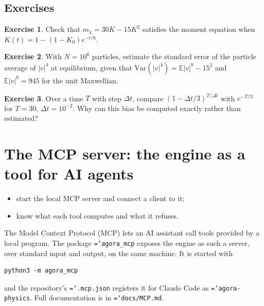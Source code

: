 \documentclass[11pt,a4paper,openany]{book}
\newcommand{\code}[1]{\texttt{\hyphenchar\font=`\-\relax #1}}
\theoremstyle{definition}
\newtheorem{exercise}{Exercise}[chapter]
\theoremstyle{plain}
\begin{document}
\section*{Exercises}
\begin{exercise}\label{ex:m4}
Check that $m_4=30K-15K^2$ satisfies the moment equation when $K(t)=1-(1-K_0)e^{-t/6}$.
\end{exercise}
\begin{exercise}\label{ex:mcerr}
With $N=10^6$ particles, estimate the standard error of the particle average of $|v|^4$ at
equilibrium, given that $\mathrm{Var}(|v|^4)=\mathbb E|v|^8-15^2$ and $\mathbb E|v|^8=945$ for the
unit Maxwellian.
\end{exercise}
\begin{exercise}\label{ex:bias}
Over a time $T$ with step $\Delta t$, compare $(1-\Delta t/3)^{T/\Delta t}$ with $e^{-T/3}$ for
$T=30$, $\Delta t=10^{-2}$. Why can this bias be computed exactly rather than estimated?
\end{exercise}

\chapter{The MCP server: the engine as a tool for AI agents}
\label{ch:mcp}

\begin{objectives}
\begin{itemize}
  \item start the local MCP server and connect a client to it;
  \item know what each tool computes and what it refuses.
\end{itemize}
\end{objectives}

The Model Context Protocol (MCP) lets an AI assistant call tools provided by a local program. The
package \code{agora\_mcp} exposes the engine as such a server, over standard input and output, on
the same machine. It is started with
\begin{verbatim}
python3 -m agora_mcp
\end{verbatim}
and the repository's \code{.mcp.json} registers it for Claude Code as \code{agora-physics}. Full
documentation is in \code{docs/MCP.md}.
\end{document}
